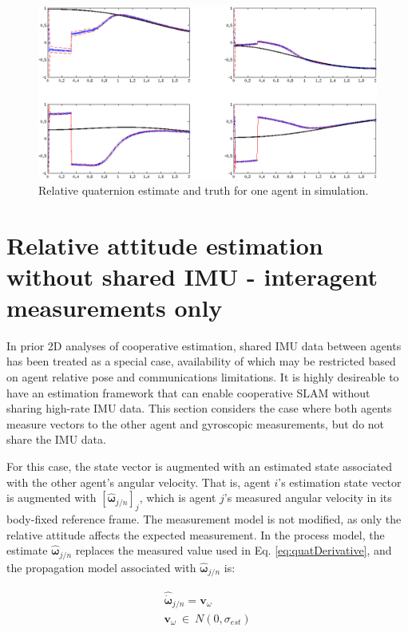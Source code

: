 \documentclass{aiaa-tc}
\newcommand{\br}[2]{[#1]_{#2}} %
\newcommand{\B}[1]{\textbf{#1}} %
\newcommand{\BG}[1]{{\bm #1}}           %
\begin{document}
\begin{figure}[tb!]
\centering
\includegraphics[width=1.0\textwidth]{estimate_history_w_omega_measured.png}
\caption{Relative quaternion estimate and truth for one agent in simulation.}
\label{fig:estimate_history_w_omega_measured}
\end{figure}

\section{Relative attitude estimation without shared IMU - interagent measurements only}

In prior 2D analyses of cooperative estimation, shared IMU data between agents has been treated as a special case, availability of which may be restricted based on agent relative pose and communications limitations. It is highly desireable to have an estimation framework that can enable cooperative SLAM without sharing high-rate IMU data. This section considers the case where both agents measure vectors to the other agent and gyroscopic measurements, but do not share the IMU data.

For this case, the state vector is augmented with an estimated state associated with the other agent's angular velocity. That is, agent $i$'s estimation state vector is augmented with $\br{ \hat{ \BG{\omega} }_{j/n} }{j}$, which is agent $j$'s measured angular velocity in its body-fixed reference frame. The measurement model is not modified, as only the relative attitude affects the expected measurement. In the process model, the estimate $\hat{\BG{\omega}}_{j/n}$ replaces the measured value used in Eq. \ref{eq:quatDerivative}, and the propagation model associated with $\hat{\BG{\omega}}_{j/n}$ is:

\begin{align}
\hat{\dot{\BG{\omega}}}_{j/n} = \B{v}_{\omega} \\
\B{v}_{\omega} \ \in \ N(0,\sigma_{est})
\end{align}
\end{document}
